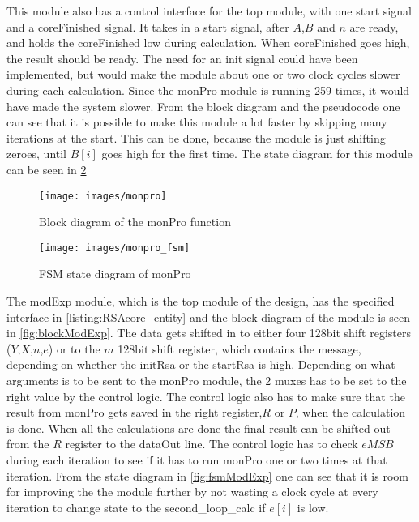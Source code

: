 This module also has a control interface for the top module, with one start signal and a coreFinished signal. It takes in a start signal, after $A$,$B$ and $n$ are ready, and holds the coreFinished low during calculation. When coreFinished goes high, the result should be ready. The need for an init signal could have been implemented, but would make the module about one or two clock cycles slower during each calculation. Since the monPro module is running 259 times, it would have made the system slower. From the block diagram and the pseudocode one can see that it is possible to make this module a lot faster by skipping many iterations at the start. This can be done, because the module is just shifting zeroes, until $B[i]$ goes high for the first time. The state diagram for this module can be seen in \cref{fig:fsmMonPro}

\begin{figure}[htp]
    \centering
    \texttt{[image: images/monpro]}
    \caption{Block diagram of the monPro function}
    \label{fig:blockMonPro}
\end{figure}

\begin{figure}[htp]
    \centering
    \texttt{[image: images/monpro\_fsm]}
    \caption{FSM state diagram of monPro}
    \label{fig:fsmMonPro}
\end{figure}

The modExp module, which is the top module of the design, has the specified interface in \cref{listing:RSAcore_entity} and the block diagram of the module is seen in \cref{fig:blockModExp}. The data gets shifted in to either four 128bit shift registers ($Y$,$X$,$n$,$e$) or to the $m$ 128bit shift register, which contains the message, depending on whether the initRsa or the startRsa is high. Depending on what arguments is to be sent to the monPro module, the 2 muxes has to be set to the right value by the control logic. The control logic also has to make sure that the result from monPro gets saved in the right register,$R$ or $P$, when the calculation is done. When all the calculations are done the final result can be shifted out from the $R$ register to the dataOut line. The control logic has to check $eMSB$ during each iteration to see if it has to run monPro one or two times at that iteration. From the state diagram in \cref{fig:fsmModExp} one can see that it is room for improving the the module further by not wasting a clock cycle at every iteration to change state to the second\_loop\_calc if $e[i]$ is low.

